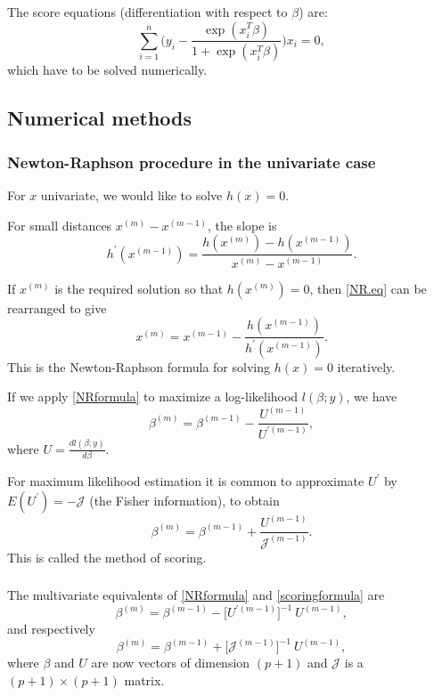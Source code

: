 \documentclass{beamer}
\newcommand{\bs}{\bigskip}
\begin{document}
\begin{frame}
\frametitle{}

The score equations (differentiation with respect to $\beta$) are:
$$\sum_{i=1}^n \Big(y_i  - \frac{\exp(x_i^T \beta)}{1+\exp(x_i^T
  \beta)} \Big)   x_i = 0,$$
which have to be solved numerically.

\end{frame}

\subsection{Numerical methods}
\begin{frame}
\frametitle{Newton-Raphson procedure in the
univariate case}

For $x$ univariate, we would like to solve $h(x)=0.$

\bs

For small distances $x^{(m)} - x^{(m-1)}$, the slope is
\begin{equation}
  \label{NR.eq}
 h^{\prime}(x^{(m-1)}) = \frac{h(x^{(m)})-h(x^{(m-1)})}{x^{(m)} - x^{(m-1)}}.
\end{equation}

\bs
If $x^{(m)}$ is the required solution so that $h(x^{(m)})=0$, then
\eqref{NR.eq} can be rearranged to give
\begin{equation}
  \label{NRformula}
  x^{(m)} = x^{(m-1)} - \frac{h(x^{(m-1)})}{h^{\prime}(x^{(m-1)})}.
\end{equation}
This is the Newton-Raphson formula for solving $h(x)=0$ iteratively.
\label{Ufct}
\end{frame}

\begin{frame}
If we apply \eqref{NRformula} to maximize a log-likelihood $l(\beta;y)$, we
have
$$\beta^{(m)} = \beta^{(m-1)} - \frac{U^{(m-1)}}{U^{\prime (m-1)}},$$
where $U=  \frac{d l(\beta;y)}{d \beta}$.

\bs
For maximum likelihood estimation it is common to approximate
$U^{\prime}$ by $E(U^{\prime}) = - {\mathcal J}$ (the Fisher information), to obtain 
\begin{equation}
  \label{scoringformula}
  \beta^{(m)} = \beta^{(m-1)} + \frac{U^{(m-1)}}{{\mathcal J}^{(m-1)}}.
\end{equation}
This is called the {\color{blue}method of scoring}.
\end{frame}

\begin{frame}
\frametitle{}
The multivariate equivalents of  \eqref{NRformula} and
\eqref{scoringformula} are
$$\beta^{(m)} = \beta^{(m-1)} - \big[U^{\prime (m-1)}\big]^{-1} \ U^{(m-1)},$$
and respectively
\begin{equation}
  \label{multiscoring}
\beta^{(m)} = \beta^{(m-1)} + \big[{\mathcal J}^{(m-1)}\big]^{-1} \ U^{(m-1)},
\end{equation}
where $\beta$ and $U$ are now vectors of dimension $(p+1)$ and
${\mathcal J}$ is a $(p+1) \times (p+1)$ matrix.
\end{frame}
\end{document}
